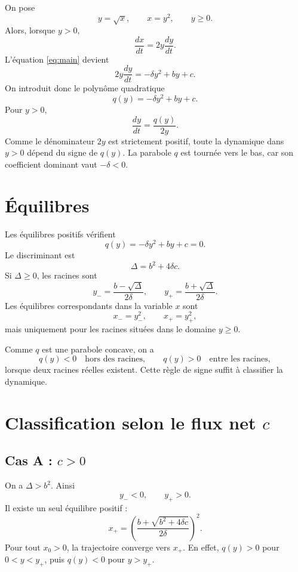 \documentclass[11pt,a4paper]{article}
\begin{document}
On pose
\[
    y=\sqrt{x},\qquad x=y^2,\qquad y\geq 0.
\]
Alors, lorsque \(y>0\),
\[
    \frac{dx}{dt}=2y\frac{dy}{dt}.
\]
L'équation \eqref{eq:main} devient
\[
    2y\frac{dy}{dt}
    =
    -\delta y^2+by+c.
\]
On introduit donc le polynôme quadratique
\begin{equation}
    q(y)=-\delta y^2+by+c.
    \label{eq:q}
\end{equation}
Pour \(y>0\),
\begin{equation}
    \frac{dy}{dt}=\frac{q(y)}{2y}.
    \label{eq:y}
\end{equation}
Comme le dénominateur \(2y\) est strictement positif, toute la dynamique dans \(y>0\) dépend du signe de \(q(y)\). La parabole \(q\) est tournée vers le bas, car son coefficient dominant vaut \(-\delta<0\).

\section{Équilibres}

Les équilibres positifs vérifient
\[
    q(y)=-\delta y^2+by+c=0.
\]
Le discriminant est
\[
    \Delta=b^2+4\delta c.
\]
Si \(\Delta\geq 0\), les racines sont
\begin{equation}
    y_-=\frac{b-\sqrt{\Delta}}{2\delta},
    \qquad
    y_+=\frac{b+\sqrt{\Delta}}{2\delta}.
    \label{eq:roots}
\end{equation}
Les équilibres correspondants dans la variable \(x\) sont
\[
    x_-=y_-^2,\qquad x_+=y_+^2,
\]
mais uniquement pour les racines situées dans le domaine \(y\geq 0\).

Comme \(q\) est une parabole concave, on a
\[
    q(y)<0 \quad \text{hors des racines},
    \qquad
    q(y)>0 \quad \text{entre les racines},
\]
lorsque deux racines réelles existent. Cette règle de signe suffit à classifier la dynamique.

\section{Classification selon le flux net \(c\)}

\subsection*{Cas A : \(c>0\)}

On a \(\Delta>b^2\). Ainsi
\[
    y_-<0,\qquad y_+>0.
\]
Il existe un seul équilibre positif :
\[
    x_+
    =
    \left(
        \frac{b+\sqrt{b^2+4\delta c}}{2\delta}
    \right)^2.
\]
Pour tout \(x_0>0\), la trajectoire converge vers \(x_+\). En effet, \(q(y)>0\) pour \(0<y<y_+\), puis \(q(y)<0\) pour \(y>y_+\).
\end{document}
